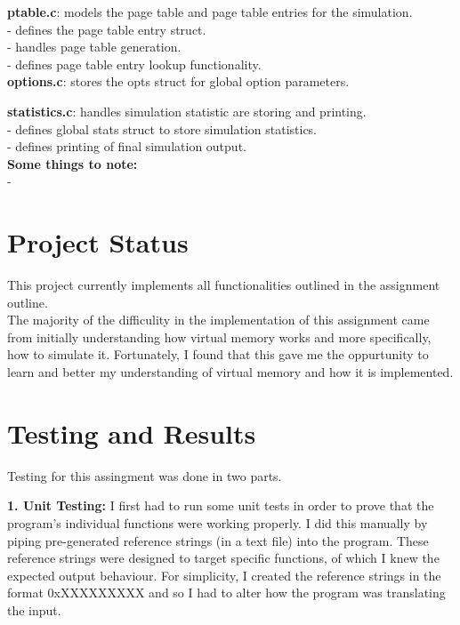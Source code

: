 \documentclass{article}
\begin{document}
\noindent
\textbf{ptable.c}: models the page table and page table entries for the simulation. \\
- defines the page table entry struct. \\
- handles page table generation. \\
- defines page table entry lookup functionality. \\

\noindent
\textbf{options.c}: stores the opts struct for global option parameters.

\noindent
\textbf{statistics.c}: handles simulation statistic are storing and printing. \\
- defines global stats struct to store simulation statistics. \\
- defines printing of final simulation output. \\

\noindent
\textbf{ Some things to note: } \\
- \\

\section{Project Status}
This project currently implements all functionalities outlined in the
assignment outline. \\

\noindent
The majority of the difficulity in the implementation of this
assignment came from initially understanding how virtual memory works and
more specifically, how to simulate it.
Fortunately, I found that this gave me the oppurtunity to learn and
better my understanding of virtual memory and how it is implemented. \\

\section{Testing and Results}

\noindent
Testing for this assingment was done in two parts.

\noindent
\textbf{1. Unit Testing:}
I first had to run some unit tests in order to prove that the program's individual
functions were working properly. I did this manually by piping pre-generated
reference strings (in a text file) into the program. These reference strings
were designed to target specific functions, of which I knew the expected output
behaviour. For simplicity, I created the reference strings in the format 0xXXXXXXXXX
and so I had to alter how the program was translating the input. \\
\end{document}
